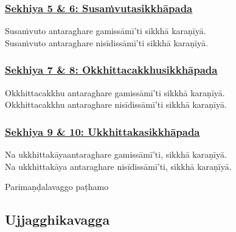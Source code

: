 \subsubsection*{\hyperref[training5-6]{Sekhiya 5 \& 6: Susaṁvutasikkhāpada}}
\label{sekh5-6}

Susaṁvuto antaraghare gamissāmī'ti sikkhā karaṇīyā.\\
Susaṁvuto antaraghare nisīdissāmī'ti sikkhā karaṇīyā.



\subsubsection*{\hyperref[training7-8]{Sekhiya 7 \& 8: Okkhittacakkhusikkhāpada}}
\label{sekh7-8}

Okkhittacakkhu antaraghare gamissāmī'ti sikkhā karaṇīyā.\\
Okkhittacakkhu antaraghare nisīdissāmī'ti sikkhā karaṇīyā.



\subsubsection*{\hyperref[training9-10]{Sekhiya 9 \& 10: Ukkhittakasikkhāpada}}
\label{sekh9-10}

Na ukkhittakāya\makeatletter\hyperlink{endnote473-appendix}\makeatother \thinspace antaraghare gamissāmī'ti, sikkhā karaṇīyā.\\
Na ukkhittakāya antaraghare nisīdissāmī'ti, sikkhā karaṇīyā.

\begin{center}
	Parimaṇḍalavaggo paṭhamo\makeatletter\hyperlink{endnote474-appendix}\makeatother \thinspace
\end{center}



\subsection{Ujjagghikavagga}

